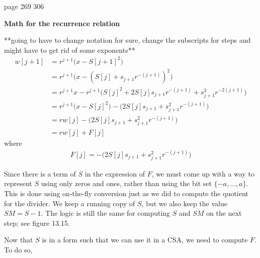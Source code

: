 \documentclass[12pt]{article}
\begin{document}
page 269 306

\vfill 
\eject

\large{\bf{
Math for the recurrence relation}}

**going to have to change notation for sure, change the subscripts for steps and might have to get rid of some exponents**
\begin{align*}
    w[j+1] &= r^{j+1}\big(x-S[j+1]^2\big)\\
    &= r^{j+1}\big(x-(S[j]+s_{j+1}r^{-(j+1)})^2\big)\\
    &= r^{j+1}x-r^{j+1}\big(S[j]^2+2S[j]s_{j+1}r^{-(j+1)}+s^2_{j+1}r^{-2(j+1)}\big)\\
    &= r^{j+1}\big(x-S[j]^2\big)-\big(2S[j]s_{j+1}+s_{j+1}^2r^{-(j+1)}\big)\\
    &= rw[j]-\big(2S[j]s_{j+1}+s_{j+1}^2r^{-(j+1)}\big)\\
    &= rw[j]+F[j]
\end{align*}
where
\begin{align*}
    F[j]=-\big(2S[j]s_{j+1}+s_{j+1}^2r^{-(j+1)}\big)
\end{align*}

Since there is a term of $S$ in the expression of $F$, we must come up with a way to represent $S$ using only zeros and ones, rather than using the bit set $\{-a,\ldots,a\}$. This is done using on-the-fly conversion just as we did to compute the quotient for the divider. We keep a running copy of $S$, but we also keep the value $SM=S-1$. The logic is still the same for computing $S$ and $SM$ on the next step; see figure 13.15. 

Now that $S$ is in a form such that we can use it in a CSA, we need to compute $F$. To do so, 
\end{document}
